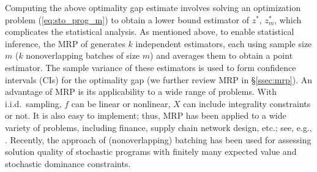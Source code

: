 \documentclass[12pt]{article}
\newcommand{\X}{X}
\newcommand{\x}{\mathbf{x}}
\newcommand{\xh}{{\hat{\x}}}
\newcommand{\zs}{z^*}
\begin{document}
Computing the above optimality gap estimate involves solving an optimization problem (\ref{eq:sto_prog_m}) to obtain a lower bound estimator of $\zs$, $\zs_m$, which complicates the statistical analysis. 
As mentioned above, to enable statistical inference, the MRP of \citet{Mak1999} generates $k$ independent estimators, each using sample size $m$ ($k$ nonoverlapping batches of size $m$) and averages them to obtain a point estimator.  
The sample variance of these estimators is used to form confidence intervals (CIs) for the optimality gap (we further review MRP in \S \ref{ssec:mrp}).  
An advantage of MRP is its applicability to a wide range of problems.  
With i.i.d.\ sampling, $f$ can be linear or nonlinear, $\X$ can include integrality constraints or not.  
It is also easy to implement; thus, MRP has been applied to a wide variety of problems, including finance, supply chain network design, etc.; see, e.g., \citep{bertocchi_etal_99,janjarassuk_linderoth_08,santoso_ahmed_etal_05}.  
Recently, the approach of (nonoverlapping) batching has been used for assessing solution quality of stochastic programs with finitely many expected value \citep{wang_ahmed_08} and stochastic dominance \citep{hu2010sample} constraints.

\end{document}

